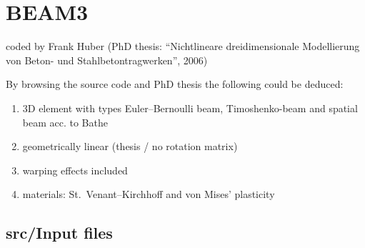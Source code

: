 



\chapter{BEAM3}

coded by Frank Huber (PhD thesis: ``Nichtlineare dreidimensionale Modellierung
von Beton- und Stahlbetontragwerken'', 2006)

By browsing the \ccarat{} source code and PhD thesis the following could be
deduced: 
\begin{enumerate}
\item 3D element with types Euler--Bernoulli beam, Timoshenko-beam and spatial
  beam acc. to Bathe
\item geometrically linear (thesis / no rotation matrix)
\item warping effects included
\item materials: St.~Venant--Kirchhoff and von Mises' plasticity
\end{enumerate}

\section{src/Input files}

